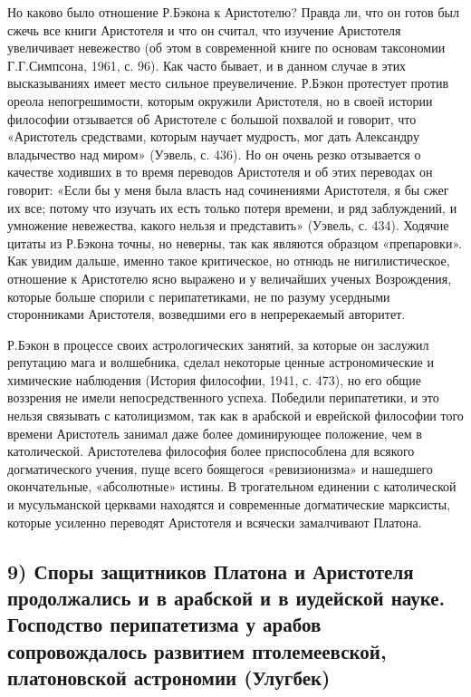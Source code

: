 Но каково было отношение Р.Бэкона к Аристотелю? Правда ли, что он
готов был сжечь все книги Аристотеля и что он считал, что изучение
Аристотеля увеличивает невежество (об этом в современной книге по
основам таксономии Г.Г.Симпсона, 1961, с. 96). Как часто бывает, и в
данном случае в этих высказываниях имеет место сильное преувеличение.
Р.Бэкон протестует против ореола непогрешимости, которым окружили
Аристотеля, но в своей истории философии отзывается об Аристотеле с
большой похвалой и говорит, что «Аристотель средствами, которым
научает мудрость, мог дать Александру владычество над миром» (Уэвель,
с. 436). Но он очень резко отзывается о качестве ходивших в то время
переводов Аристотеля и об этих переводах он говорит: «Если бы у меня
была власть над сочинениями Аристотеля, я бы сжег их все; потому что
изучать их есть только потеря времени, и ряд заблуждений, и умножение
невежества, какого нельзя и представить» (Уэвель, с. 434). Ходячие
цитаты из Р.Бэкона точны, но неверны, так как являются образцом
«препаровки». Как увидим дальше, именно такое критическое, но отнюдь
не нигилистическое, отношение к Аристотелю ясно выражено и у
величайших ученых Возрождения, которые больше спорили с
перипатетиками, не по разуму усердными сторонниками Аристотеля,
возведшими его в непререкаемый авторитет.

Р.Бэкон в процессе своих астрологических занятий, за которые он
заслужил репутацию мага и волшебника, сделал некоторые ценные
астрономические и химические наблюдения (История философии, 1941, с.
473), но его общие воззрения не имели непосредственного успеха.
Победили перипатетики, и это нельзя связывать с католицизмом, так как
в арабской и еврейской философии того времени Аристотель занимал даже
более доминирующее положение, чем в католической. Аристотелева
философия более приспособлена для всякого догматического учения, пуще
всего боящегося «ревизионизма» и нашедшего окончательные, «абсолютные»
истины. В трогательном единении с католической и мусульманской
церквами находятся и современные догматические марксисты, которые
усиленно переводят Аристотеля и всячески замалчивают Платона.

\subsection{9) Споры защитников Платона и Аристотеля продолжались и в
арабской и в иудейской науке. Господство перипатетизма у
арабов сопровождалось развитием птолемеевской, платоновской
астрономии (Улугбек)}

